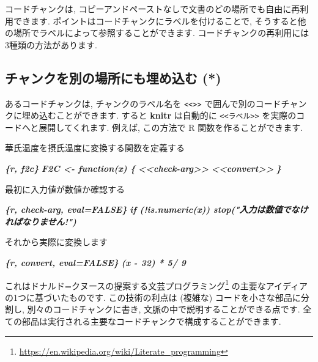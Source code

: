 \documentclass[
  11pt,
  lualatex,
  ja=standard]{bxjsreport}
\newenvironment{Shaded}{\begin{snugshade}}{\end{snugshade}}
\newcommand{\InformationTok}[1]{\textcolor[rgb]{0.56,0.35,0.01}{\textbf{\textit{#1}}}}
\newcommand{\NormalTok}[1]{#1}
\renewcommand{\href}[2]{#2\footnote{\url{#1}}}
\begin{document}
コードチャンクは, コピーアンドペーストなしで文書のどの場所でも自由に再利用できます. ポイントはコードチャンクにラベルを付けることで, そうすると他の場所でラベルによって参照することができます. コードチャンクの再利用には3種類の方法があります.

\hypertarget{embed-chunk}{%
\subsection{チャンクを別の場所にも埋め込む (*)}\label{embed-chunk}}

あるコードチャンクは, チャンクのラベル名を \texttt{\textless{}\textless{}\textgreater{}\textgreater{}} で囲んで別のコードチャンクに埋め込むことができます. すると \textbf{knitr} は自動的に \texttt{\textless{}\textless{}ラベル\textgreater{}\textgreater{}} を実際のコードへと展開してくれます. 例えば, この方法で R 関数を作ることができます.

\begin{Shaded}
\begin{Highlighting}[]
\NormalTok{華氏温度を摂氏温度に変換する関数を定義する}

\InformationTok{\textasciigrave{}\textasciigrave{}\textasciigrave{}\{r, f2c\}}
\InformationTok{F2C \textless{}{-} function(x) \{}
\InformationTok{  \textless{}\textless{}check{-}arg\textgreater{}\textgreater{}}
\InformationTok{  \textless{}\textless{}convert\textgreater{}\textgreater{}}
\InformationTok{\}}
\InformationTok{\textasciigrave{}\textasciigrave{}\textasciigrave{}}

\NormalTok{最初に入力値が数値か確認する}

\InformationTok{\textasciigrave{}\textasciigrave{}\textasciigrave{}\{r, check{-}arg, eval=FALSE\}}
\InformationTok{  if (!is.numeric(x)) stop("入力は数値でなければなりません!")}
\InformationTok{\textasciigrave{}\textasciigrave{}\textasciigrave{}}

\NormalTok{それから実際に変換します}

\InformationTok{\textasciigrave{}\textasciigrave{}\textasciigrave{}\{r, convert, eval=FALSE\}}
\InformationTok{  (x {-} 32) * 5/ 9}
\InformationTok{\textasciigrave{}\textasciigrave{}\textasciigrave{}}
\end{Highlighting}
\end{Shaded}

これはドナルド=クヌースの提案する\href{https://en.wikipedia.org/wiki/Literate_programming}{文芸プログラミング} の主要なアイディアの1つに基づいたものです. この技術の利点は (複雑な) コードを小さな部品に分割し, 別々のコードチャンクに書き, 文脈の中で説明することができる点です. 全ての部品は実行される主要なコードチャンクで構成することができます.
\end{document}
